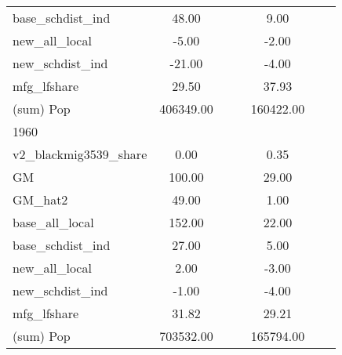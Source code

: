 \begin{table}[htbp]
\begin{tabular}{l*{2}{ccc}}
base\_schdist\_ind    &       48.00&            &            &        9.00&            &            \\
new\_all\_local       &       -5.00&            &            &       -2.00&            &            \\
new\_schdist\_ind     &      -21.00&            &            &       -4.00&            &            \\
mfg\_lfshare         &       29.50&            &            &       37.93&            &            \\
(sum) Pop           &   406349.00&            &            &   160422.00&            &            \\
\midrule
1960                &            &            &            &            &            &            \\
v2\_blackmig3539\_share&        0.00&            &            &        0.35&            &            \\
GM                  &      100.00&            &            &       29.00&            &            \\
GM\_hat2             &       49.00&            &            &        1.00&            &            \\
base\_all\_local      &      152.00&            &            &       22.00&            &            \\
base\_schdist\_ind    &       27.00&            &            &        5.00&            &            \\
new\_all\_local       &        2.00&            &            &       -3.00&            &            \\
new\_schdist\_ind     &       -1.00&            &            &       -4.00&            &            \\
mfg\_lfshare         &       31.82&            &            &       29.21&            &            \\
(sum) Pop           &   703532.00&            &            &   165794.00&            &            \\
\bottomrule
\end{tabular}
\end{table}
